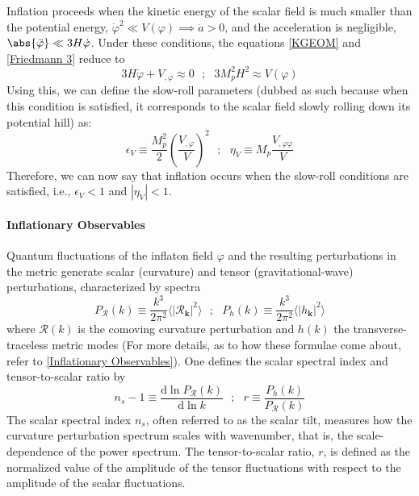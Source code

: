 \documentclass[aps,prd,reprint,preprintnumbers,showpacs,floatfix,nofootinbib,superscript address]{revtex4-2}
\begin{document}

Inflation proceeds when the kinetic energy of the scalar field is much smaller than the potential energy, $\dot{\varphi}^2 \ll V(\varphi) \implies \ddot{a} > 0$, and the acceleration is negligible, $\abs{\ddot{\varphi}} \ll 3H\dot{\varphi}$. Under these conditions, the equations \cref{KGEOM} and \cref{Friedmann 3} reduce to
\begin{equation}
    3H\dot{\varphi} + V_{,\varphi} \approx 0 \,\,\,\,;\,\,\,\, 3M_p^2H^2 \approx V(\varphi)
\end{equation}
Using this, we can define the slow-roll parameters (dubbed as such because when this condition is satisfied, it corresponds to the scalar field slowly rolling down its potential hill) as:
\begin{equation} \label{Slow roll parameters}
    \epsilon_V \equiv \frac{M_p^2}{2} \left(\frac{V_{,\varphi}}{V} \right)^2 \,\,\,\,;\,\,\,\, \eta_V \equiv M_p \frac{V_{,\varphi \varphi}}{V} 
\end{equation}
Therefore, we can now say that inflation occurs when the slow-roll conditions are satisfied, i.e., $\epsilon_V < 1$ and $|\eta_V|< 1$.

\paragraph*{Inflationary Observables} 
Quantum fluctuations of the inflaton field $\varphi$ and the resulting perturbations in the metric generate scalar (curvature) and tensor (gravitational-wave) perturbations, characterized by spectra
\begin{equation}
    P_\mathcal{R}(k) \equiv \frac{k^3}{2\pi^2} \langle| \mathcal{R}_{\bm{k}}|^2 \rangle \,\,\,\,;\,\,\,\, P_h(k) \equiv \frac{k^3}{2\pi^2} \langle| h_{\bm{k}}|^2 \rangle
\end{equation}
where $\mathcal{R}(k)$ is the comoving curvature perturbation and $h(k)$ the transverse-traceless metric modes (For more details, as to how these formulae come about, refer to \cref{Inflationary Observables}). One defines the scalar spectral index and tensor-to-scalar ratio by
\begin{equation}
    n_s - 1 \equiv \frac{\text{d} \ln P_\mathcal{R}(k) }{\text{d} \ln k} \,\,\,\,;\,\,\,\, r \equiv \frac{P_h(k)}{P_\mathcal{R}(k)}
\end{equation}
The scalar spectral index $n_s$, often referred to as the scalar tilt, measures how the curvature perturbation spectrum scales with wavenumber, that is, the scale-dependence of the power spectrum. The tensor-to-scalar ratio, $r$, is defined as the normalized value of the amplitude of the tensor fluctuations with respect to the amplitude of the scalar fluctuations.
\end{document}
